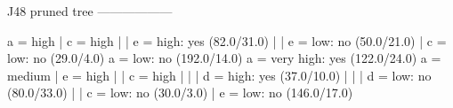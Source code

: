 J48 pruned tree
------------------

a = high
|   c = high
|   |   e = high: yes (82.0/31.0)
|   |   e = low: no (50.0/21.0)
|   c = low: no (29.0/4.0)
a = low: no (192.0/14.0)
a = very high: yes (122.0/24.0)
a = medium
|   e = high
|   |   c = high
|   |   |   d = high: yes (37.0/10.0)
|   |   |   d = low: no (80.0/33.0)
|   |   c = low: no (30.0/3.0)
|   e = low: no (146.0/17.0)
